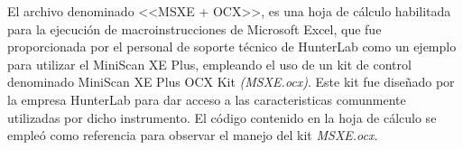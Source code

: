 			El archivo denominado <<MSXE + OCX>>, es una hoja de c\'{a}lculo habilitada para la ejecuci\'{o}n de macroinstrucciones de Microsoft Excel, que fue proporcionada por el personal de soporte t\'{e}cnico de HunterLab como un ejemplo para utilizar el MiniScan XE Plus, empleando el uso de un kit de control denominado MiniScan XE Plus OCX Kit \textit{(MSXE.ocx)}. Este kit fue dise\~{n}ado por la empresa HunterLab para dar acceso a las caracteristicas comunmente utilizadas por dicho instrumento. El c\'{o}digo contenido en la hoja de c\'{a}lculo se emple\'{o} como referencia para observar el manejo del kit \textit{MSXE.ocx}.

		